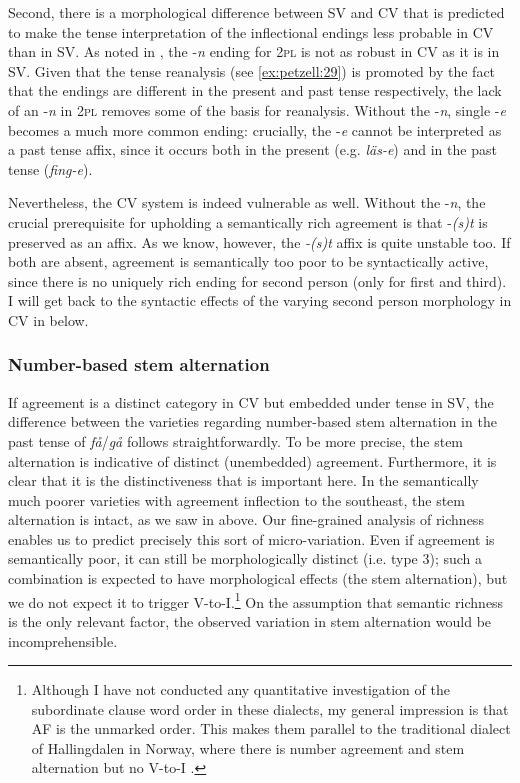 \documentclass[output=paper,colorlinks,citecolor=brown,draft,draftmode]{langscibook}
\begin{document}
Second, there is a morphological difference between SV and CV that is predicted to make the tense interpretation of the inflectional endings less probable in CV than in SV. As noted in , the -\textit{n} ending for 2\textsc{pl} is not as robust in CV as it is in SV. Given that the tense reanalysis (see \ref{ex:petzell:29}) is promoted by the fact that the endings are different in the present and past tense respectively, the lack of an -\textit{n} in 2\textsc{pl} removes some of the basis for reanalysis. Without the -\textit{n}, single -\textit{e} becomes a much more common ending: crucially, the -\textit{e} cannot be interpreted as a past tense affix, since it occurs both in the present (e.g. \textit{läs-e}) and in the past tense (\textit{fing-e}).



Nevertheless, the CV system is indeed vulnerable as well. Without the -\textit{n}, the crucial prerequisite for upholding a semantically rich agreement is that -\textit{(s)t} is preserved as an affix. As we know, however, the \textit{-(s)t} affix is quite unstable too. If both are absent, agreement is semantically too poor to be syntactically active, since there is no uniquely rich ending for second person (only for first and third). I will get back to the syntactic effects of the varying second person morphology in CV in  below.


\subsubsection{Number-based stem alternation}\label{sec:petzell:4.3.4}


If agreement is a distinct category in CV but embedded under tense in SV, the difference between the varieties regarding number-based stem alternation in the past tense of \textit{få}/\textit{gå} follows straightforwardly. To be more precise, the stem alternation is indicative of distinct (unembedded) agreement. Furthermore, it is clear that it is the distinctiveness that is important here. In the semantically much poorer varieties with agreement inflection to the southeast, the stem alternation is intact, as we saw in  above. Our fine-grained analysis of richness enables us to predict precisely this sort of micro-variation. Even if agreement is semantically poor, it can still be morphologically distinct (i.e. type 3); such a combination is expected to have morphological effects (the stem alternation), but we do not expect it to trigger V-to-I.\footnote{Although I have not conducted any quantitative investigation of the subordinate clause word order in these dialects, my general impression is that AF is the unmarked order. This makes them parallel to the traditional dialect of Hallingdalen in Norway, where there is number agreement and stem alternation but no V-to-I \citep{Trosterud1989}.}  On the assumption that semantic richness is the only relevant factor, the observed variation in stem alternation would be incomprehensible.
\end{document}
